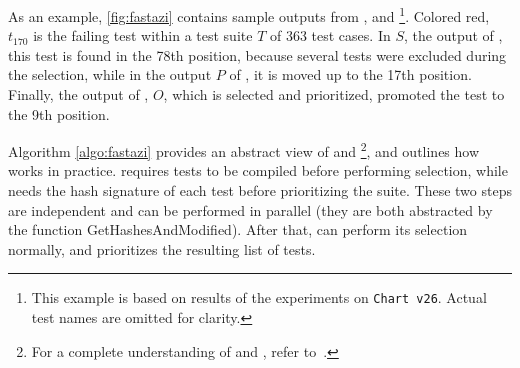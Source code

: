 As an example, \autoref{fig:fastazi} contains sample outputs from \ek, \fs and \fz\footnote{This example is based on results of the experiments on \texttt{Chart v26}. Actual test names are omitted for clarity.}.
Colored red, $t_{170}$ is the failing test within a test suite $T$ of 363 test cases.
In $S$, the output of \ek, this test is found in the 78th position, because several tests were excluded during the selection, while in the output $P$ of \fs, it is moved up to the 17th position.
Finally, the output of \fz, $O$, which is selected and prioritized, promoted the test to the 9th position.

Algorithm \autoref{algo:fastazi} provides an abstract view of \ek and \fs\footnote{For a complete understanding of \ek and \fs, refer to~\cite{gligoricEk,miranda_fast}.}, and outlines how \fz works in practice.
\ek requires tests to be compiled before performing selection, while \fs needs the hash signature of each test before prioritizing the suite.
These two steps are independent and can be performed in parallel (they are both abstracted by the function GetHashesAndModified).
After that, \ek can perform its selection normally, and \fs prioritizes the resulting list of tests.





